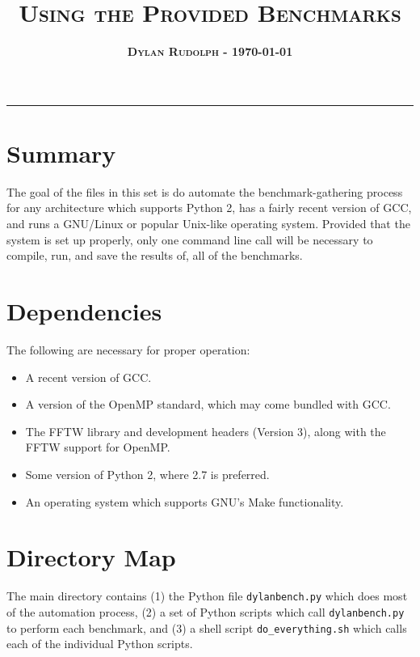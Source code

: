 \documentclass [letterpaper, 10pt, notitlepage, fleqn, oneside, 
  landscape] {article}
\title{\vspace{-5.0ex} \huge \bf \textsc{
    Using the Provided Benchmarks
    } \vspace{-1.5ex} }
\author{\large \bf \textsc{Dylan Rudolph - \today} }
\date{\vspace{-6.6ex}}
\begin{document}
\setlength{\pdfpagewidth}{11in}
\setlength{\pdfpageheight}{8.5in}

\maketitle
\rule{\textwidth}{1pt}
\vspace{-0.50cm}
\begin{multicols}{2}

\section{Summary}

The goal of the files in this set is do automate the benchmark-gathering process
for any architecture which supports Python 2, has a fairly recent version of GCC, 
and runs a GNU/Linux or popular Unix-like operating system. Provided that the 
system is set up properly, only one command line call will be necessary to 
compile, run, and save the results of, all of the benchmarks.

\section{Dependencies} 

The following are necessary for proper operation:
\begin{itemize}[leftmargin=0.6cm]
  \item A recent version of GCC.
  \item A version of the OpenMP standard, which may come bundled with GCC.
  \item The FFTW library and development headers (Version 3), along with 
    the FFTW support for OpenMP.
  \item Some version of Python 2, where 2.7 is preferred.
  \item An operating system which supports GNU's Make functionality.
\end{itemize}

\section{Directory Map}

The main directory contains (1) the Python file \texttt{dylanbench.py} which 
does most of the automation process, (2) a set of Python scripts which call 
\texttt{dylanbench.py} to perform each benchmark, and (3) a shell script 
\texttt{do\_everything.sh} which calls each of the individual Python scripts.


\end{multicols}
\end{document}
